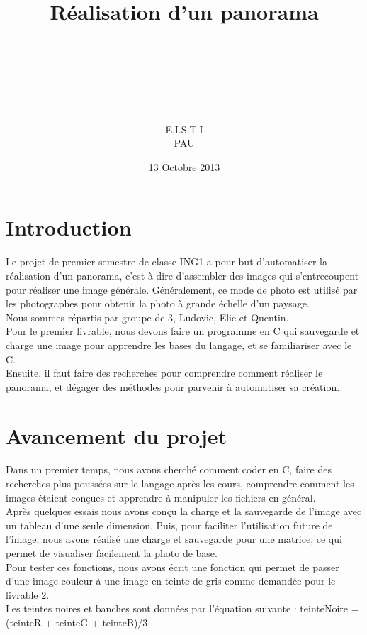 \documentclass[a4paper,french,12pt]{report}
\begin{document}
\title{Réalisation d'un panorama}

\author{
	 \\ 
	 \\ 
	 \\ \\ \\ \\
	E.I.S.T.I\\ 
	PAU} 
\date{13 Octobre 2013}


\maketitle
\tableofcontents

\onehalfspacing

	\chapter*{Introduction}	
	    Le projet de premier semestre de classe ING1 a pour but d'automatiser la réalisation d'un panorama, c'est-à-dire d'assembler des images qui s'entrecoupent pour réaliser une image générale. Généralement, ce mode de photo est utilisé par les photographes pour obtenir la photo à grande échelle d'un paysage.\\
	    Nous sommes répartis par groupe de 3, Ludovic, Elie et Quentin.\\
	    Pour le premier livrable, nous devons faire un programme en C qui sauvegarde et charge une image pour apprendre les bases du langage, et se familiariser avec le C.\\
	    Ensuite, il faut faire des recherches pour comprendre comment réaliser le panorama, et dégager des méthodes pour parvenir à automatiser sa création.
	\chapter{Avancement du projet}
		    Dans un premier temps, nous avons cherché comment coder en C, faire des recherches plus poussées sur le langage après les cours, comprendre comment les images étaient conçues et apprendre à manipuler les fichiers en général.\\
		    Après quelques essais nous avons conçu la charge et la sauvegarde de l'image avec un tableau d'une seule dimension. Puis, pour faciliter l'utilisation future de l'image, nous avons réalisé une charge et sauvegarde pour une matrice, ce qui permet de visualiser facilement la photo de base.\\
		    Pour tester ces fonctions, nous avons écrit une fonction qui permet de passer d'une image couleur à une image en teinte de gris comme demandée pour le livrable 2.\\
		    Les teintes noires et banches sont données par l'équation suivante : teinteNoire = (teinteR + teinteG + teinteB)/3.
\end{document}
